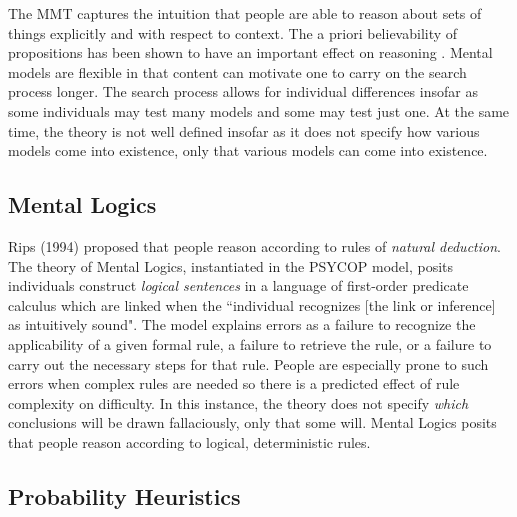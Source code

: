 \documentclass[10pt,letterpaper]{article}
\begin{document}
The MMT captures the intuition that people are able to reason about sets of things explicitly and with respect to context.  The a priori believability of propositions has been shown to have an important effect on reasoning \cite{Oakhill1989}. Mental models are flexible in that content can motivate one to carry on the search process longer. The search process allows for individual differences insofar as some individuals may test many models and some may test just one. At the same time, the theory is not well defined insofar as it does not specify how various models come into existence, only that various models can come into existence.


\subsection{Mental Logics}

Rips (1994) proposed that people reason according to rules of \emph{natural deduction}. The theory of Mental Logics, instantiated in the PSYCOP model, posits individuals construct \emph{logical sentences} in a language of first-order predicate calculus which are linked when the ``individual recognizes [the link or inference] as intuitively sound". The model explains errors as a failure to recognize the applicability of a given formal rule, a failure to retrieve the rule, or a failure to carry out the necessary steps for that rule. People are especially prone to such errors when complex rules are needed so there is a predicted effect of rule complexity on difficulty. In this instance, the theory does not specify \emph{which} conclusions will be drawn fallaciously, only that some will. Mental Logics posits that people reason according to logical, deterministic rules. 

\subsection{Probability Heuristics}
\end{document}
